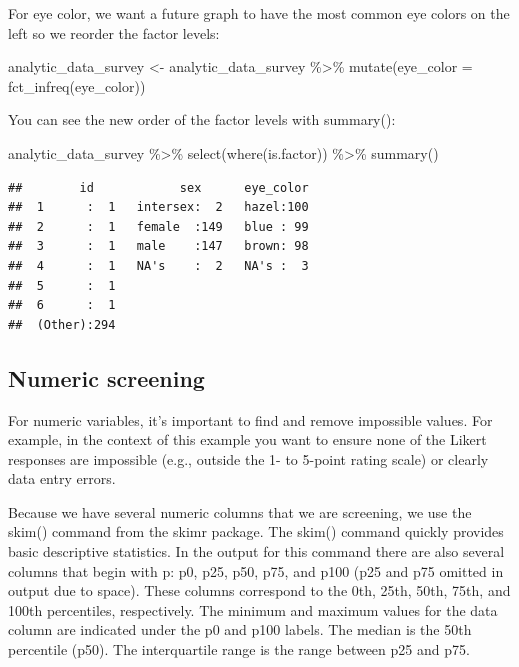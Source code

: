 \documentclass[
]{krantz}
\makeatletter
\newenvironment{Shaded}{\begin{snugshade}}{\end{snugshade}}
\newcommand{\AttributeTok}[1]{\textcolor[rgb]{0.61,0.61,0.61}{#1}}
\newcommand{\FunctionTok}[1]{\textcolor[rgb]{0,0,0}{#1}}
\newcommand{\NormalTok}[1]{#1}
\newcommand{\OtherTok}[1]{\textcolor[rgb]{0.37,0.37,0.37}{#1}}
\newcommand{\SpecialCharTok}[1]{\textcolor[rgb]{0,0,0}{#1}}
\newenvironment{kframe}{%
\medskip{}
\setlength{\fboxsep}{.8em}
 \def\at@end@of@kframe{}%
 \ifinner\ifhmode%
  \def\at@end@of@kframe{\end{minipage}}%
  \begin{minipage}{\columnwidth}%
 \fi\fi%
 \def\FrameCommand##1{\hskip\@totalleftmargin \hskip-\fboxsep
 \colorbox{shadecolor}{##1}\hskip-\fboxsep
     \hskip-\linewidth \hskip-\@totalleftmargin \hskip\columnwidth}%
 \MakeFramed {\advance\hsize-\width
   \@totalleftmargin\z@ \linewidth\hsize
   \@setminipage}}%
 {\par\unskip\endMakeFramed%
 \at@end@of@kframe}
\renewenvironment{Shaded}{\begin{kframe}}{\end{kframe}}
\makeatother
\begin{document}
For eye color, we want a future graph to have the most common eye colors on the left so we reorder the factor levels:

\begin{Shaded}
\begin{Highlighting}[]
\NormalTok{analytic\_data\_survey }\OtherTok{\textless{}{-}}\NormalTok{ analytic\_data\_survey }\SpecialCharTok{\%\textgreater{}\%}
  \FunctionTok{mutate}\NormalTok{(}\AttributeTok{eye\_color =} \FunctionTok{fct\_infreq}\NormalTok{(eye\_color))}
\end{Highlighting}
\end{Shaded}

You can see the new order of the factor levels with summary():

\begin{Shaded}
\begin{Highlighting}[]
\NormalTok{analytic\_data\_survey }\SpecialCharTok{\%\textgreater{}\%}
  \FunctionTok{select}\NormalTok{(}\FunctionTok{where}\NormalTok{(is.factor)) }\SpecialCharTok{\%\textgreater{}\%}
  \FunctionTok{summary}\NormalTok{()}
\end{Highlighting}
\end{Shaded}

\begin{verbatim}
##        id            sex      eye_color  
##  1      :  1   intersex:  2   hazel:100  
##  2      :  1   female  :149   blue : 99  
##  3      :  1   male    :147   brown: 98  
##  4      :  1   NA's    :  2   NA's :  3  
##  5      :  1                             
##  6      :  1                             
##  (Other):294
\end{verbatim}

\hypertarget{numeric-screening-5}{%
\subsection{Numeric screening}\label{numeric-screening-5}}

For numeric variables, it's important to find and remove impossible values. For example, in the context of this example you want to ensure none of the Likert responses are impossible (e.g., outside the 1- to 5-point rating scale) or clearly data entry errors.

Because we have several numeric columns that we are screening, we use the skim() command from the skimr package. The skim() command quickly provides basic descriptive statistics. In the output for this command there are also several columns that begin with p: p0, p25, p50, p75, and p100 (p25 and p75 omitted in output due to space). These columns correspond to the 0th, 25th, 50th, 75th, and 100th percentiles, respectively. The minimum and maximum values for the data column are indicated under the p0 and p100 labels. The median is the 50th percentile (p50). The interquartile range is the range between p25 and p75.
\end{document}

